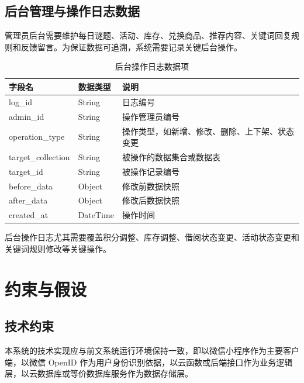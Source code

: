 \documentclass[a4paper,12pt]{article}
\begin{document}
\subsection{后台管理与操作日志数据}

管理员后台需要维护每日谜题、活动、库存、兑换商品、推荐内容、关键词回复规则和反馈留言。为保证数据可追溯，系统需要记录关键后台操作。

\begin{longtable}{p{3.5cm}p{3cm}p{7cm}}
\caption{后台操作日志数据项} \\
\toprule
字段名 & 数据类型 & 说明 \\
\midrule
log\_id & String & 日志编号 \\
admin\_id & String & 操作管理员编号 \\
operation\_type & String & 操作类型，如新增、修改、删除、上下架、状态变更 \\
target\_collection & String & 被操作的数据集合或数据表 \\
target\_id & String & 被操作记录编号 \\
before\_data & Object & 修改前数据快照 \\
after\_data & Object & 修改后数据快照 \\
created\_at & DateTime & 操作时间 \\
\bottomrule
\end{longtable}

后台操作日志尤其需要覆盖积分调整、库存调整、借阅状态变更、活动状态变更和关键词规则修改等关键操作。


\section{约束与假设}

\subsection{技术约束}

本系统的技术实现应与前文系统运行环境保持一致，即以微信小程序作为主要客户端，以微信 OpenID 作为用户身份识别依据，以云函数或后端接口作为业务逻辑层，以云数据库或等价数据库服务作为数据存储层。
\end{document}
